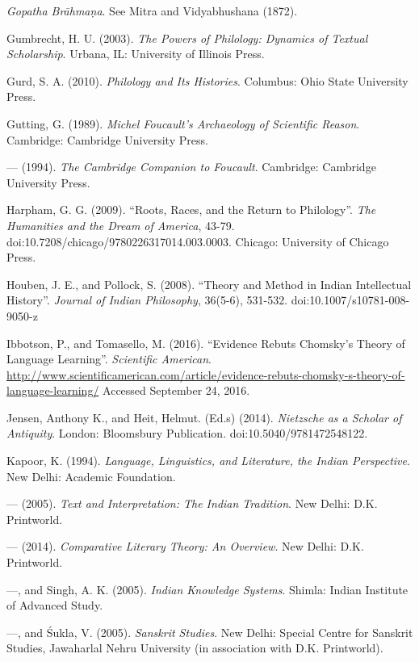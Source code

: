 \begin{thebibliography}{99}
  \textit{Gopatha Brāhmaṇa}. See Mitra and Vidyabhushana (1872).

  Gumbrecht, H. U. (2003). \textit{The Powers of Philology: Dynamics of Textual Scholarship}. Urbana, IL: University of Illinois Press.

  Gurd, S. A. (2010). \textit{Philology and Its Histories}. Columbus: Ohio State University Press.

  Gutting, G. (1989). \textit{Michel Foucault's Archaeology of Scientific Reason}. Cambridge: Cambridge University Press.

  — (1994). \textit{The Cambridge Companion to Foucault}. Cambridge: Cambridge University Press.

  Harpham, G. G. (2009). “Roots, Races, and the Return to Philology”. \textit{The Humanities and the Dream of America}, 43-79. doi:10.7208/chicago/9780226317014.003.0003. Chicago: University of Chicago Press.

  Houben, J. E., and Pollock, S. (2008). “Theory and Method in Indian Intellectual History”. \textit{Journal of Indian Philosophy}, 36(5-6), 531-532. doi:10.1007/s10781-008-9050-z

  Ibbotson, P., and Tomasello, M. (2016). “Evidence Rebuts Chomsky's Theory of Language Learning”. \textit{Scientific American}. \url{http://www.scientificamerican.com/article/evidence-rebuts-chomsky-s-theory-of-language-learning/} Accessed September 24, 2016.

  Jensen, Anthony K., and Heit, Helmut. (Ed.s) (2014). \textit{Nietzsche as a Scholar of Antiquity}. London: Bloomsbury Publication. doi:10.5040/9781472548122.

  Kapoor, K. (1994). \textit{Language, Linguistics, and Literature, the Indian Perspective}. New Delhi: Academic Foundation.

  — (2005). \textit{Text and Interpretation: The Indian Tradition}. New Delhi: D.K. Printworld.

  — (2014). \textit{Comparative Literary Theory: An Overview}. New Delhi: D.K. Printworld.

  —, and Singh, A. K. (2005). \textit{Indian Knowledge Systems}. Shimla: Indian Institute of Advanced Study.

  —, and Śukla, V. (2005). \textit{Sanskrit Studies}. New Delhi: Special Centre for Sanskrit Studies, Jawaharlal Nehru University (in association with D.K. Printworld).


\end{thebibliography}
